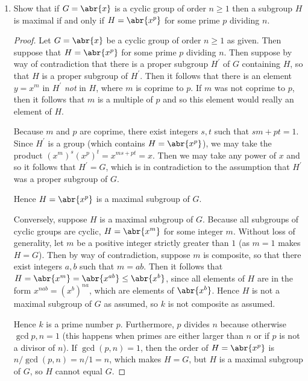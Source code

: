 \documentclass[11pt]{article}
\begin{document}
\begin{enumerate}
\begin{enumerate}[label=(\alph*)]
\begin{proof}
        Observe that there are no factors of $2n$ strictly larger than $n$ aside from $2n$. Furthermore, any other group of order $n$ in $D_{2n}$ distinct from the subgroup of all rotations will not contain all $n$ rotations, so these other subgroups of order $n$ will not contain the subgroup of all rotations.

        Hence the subgroup of all rotations in a dihedral group is a maximal subgroup.
      \end{proof}
      \item Show that if $G = \abr{x}$ is a cyclic group of order $n\geq 1$ then a subgroup $H$ is maximal if and only if $H = \abr{x^p}$ for some prime $p$ dividing $n$. \begin{proof}
        Let $G = \abr{x}$ be a cyclic group of order $n\geq 1$ as given. Then suppose that $H = \abr{x^p}$ for some prime $p$ dividing $n$. Then suppose by way of contradiction that there is a proper subgroup $H^{\prime}$ of $G$ containing $H$, so that $H$ is a proper subgroup of $H^{\prime}$. Then it follows that there is an element $y = x^m$ in $H^{\prime}$ \textit{not} in $H$, where $m$ is coprime to $p$. If $m$ was not coprime to $p$, then it follows that $m$ is a multiple of $p$ and so this element would really an element of $H$.

        Because $m$ and $p$ are coprime, there exist integers $s,t$ such that $sm+pt = 1$. Since $H^{\prime}$ is a group (which contains $H = \abr{x^p}$), we may take the product $(x^m)^s(x^p)^t = x^{ms+pt} = x$. Then we may take any power of $x$ and so it follows that $H^{\prime} = G$, which is in contradiction to the assumption that $H^{\prime}$ was a proper subgroup of $G$.

        Hence $H = \abr{x^p}$ is a maximal subgroup of $G$.

        Conversely, suppose $H$ is a maximal subgroup of $G$. Because all subgroups of cyclic groups are cyclic, $H = \abr{x^m}$ for some integer $m$. Without loss of generality, let $m$ be a positive integer strictly greater than $1$ (as $m=1$ makes $H=G$). Then by way of contradiction, suppose $m$ is composite, so that there exist integers $a,b$ such that $m = ab$. Then it follows that $H = \abr{x^m} = \abr{x^{ab}} \leq \abr{x^b}$, since all elements of $H$ are in the form $x^{nab} = (x^b)^{na}$, which are elements of $\abr{x^b}$. Hence $H$ is not a maximal subgroup of $G$ as assumed, so $k$ is not composite as assumed.

        Hence $k$ is a prime number $p$. Furthermore, $p$ divides $n$ because otherwise $\gcd{p,n} = 1$ (this happens when primes are either larger than $n$ or if $p$ is not a divisor of $n$). If $\gcd(p,n) = 1$, then the order of $H = \abr{x^p}$ is $n/\gcd(p,n) = n/1 = n$, which makes $H = G$, but $H$ is a maximal subgroup of $G$, so $H$ cannot equal $G$.


\end{proof}
\end{enumerate}
\end{enumerate}
\end{document}
